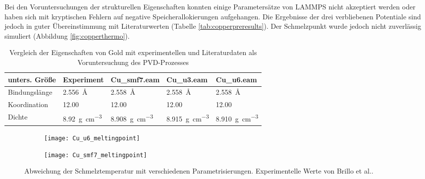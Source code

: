 Bei den Voruntersuchungen der strukturellen Eigenschaften konnten einige Parametersätze von LAMMPS nicht akzeptiert werden oder haben sich mit kryptischen Fehlern auf negative Speicherallokierungen aufgehangen.
Die Ergebnisse der drei verbliebenen Potentiale sind jedoch in guter Übereinstimmung mit Literaturwerten (Tabelle \ref{tab:copperpreresults}).
Der Schmelzpunkt wurde jedoch nicht zuverlässig simuliert (Abbildung \ref{fig:copperthermo}).

\begin{table}[hbtp]
  \caption[Eigenschaften von Gold]{Vergleich der Eigenschaften von Gold mit experimentellen und Literaturdaten als Voruntersuchung des PVD-Prozesses}
  \label{tab:goldpreresults}
  \begin{tabularx}{\textwidth}{|lXXXX|}
    \hline
    \textbf{unters. Größe} & \textbf{Experiment} & \textbf{Cu\_smf7.eam} & \textbf{Cu\_u3.eam} & \textbf{Cu\_u6.eam} \\
    \hline
    Bindungslänge  &  \SI{2.556}{\angstrom} & \SI{2.558}{\angstrom} & \SI{2.558}{\angstrom} & \SI{2.558}{\angstrom} \\
    Koordination   &  \SI{12.00}{} & \SI{12.00}{} & \SI{12.00}{} & \SI{12.00}{} \\
    Dichte         & \SI{8.92}{\gram\per\cubic\centi\meter} & \SI{8.908}{\gram\per\cubic\centi\meter} & \SI{8.915}{\gram\per\cubic\centi\meter} & \SI{8.910}{\gram\per\cubic\centi\meter} \\
    \hline
  \end{tabularx}
\end{table}


\begin{figure}[tbp]
  \centering
  \captionsetup[subfigure]{singlelinecheck=false}
  \def\subfigwidth{7cm}
  \begin{subfigure}[t]{\subfigwidth}
    \texttt{[image: Cu\_u6\_meltingpoint]}
  \end{subfigure}
  \hfill
  \begin{subfigure}[t]{\subfigwidth}
    \texttt{[image: Cu\_smf7\_meltingpoint]}
  \end{subfigure}
  \caption[Abweichung der Schmelztemperaturen bei Kupfer-MD]{
    Abweichung der Schmelztemperatur mit verschiedenen Parametrisierungen.
    Experimentelle Werte von Brillo et al.\cite{brillo_density_2006}.
  }
  \label{fig:goldthermo}
\end{figure}

